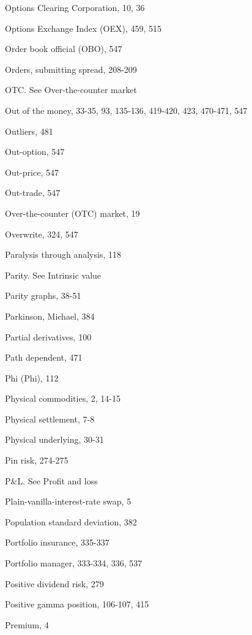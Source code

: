 \noindent Options Clearing Corporation, 10, 36\par
\noindent Options Exchange Index (OEX), 459, 515\par
\noindent Order book official (OBO), 547\par
\noindent Orders, submitting spread, 208-209\par
\noindent OTC. See Over-the-counter market\par
Out of the money, 33-35, 93, 135-136, 419-420, 423, 470-471, 547\par
\noindent Outliers, 481\par
\noindent Out-option, 547\par
\noindent Out-price, 547\par
\noindent Out-trade, 547\par
\noindent Over-the-counter (OTC) market, 19\par
\noindent Overwrite, 324, 547\par
\noindent Paralysis through analysis, 118\par
\noindent Parity. See Intrinsic value\par
\noindent Parity graphs, 38-51\par
\noindent Parkinson, Michael, 384\par
\noindent Partial derivatives, 100\par
\noindent Path dependent, 471\par
\noindent Phi (Phi), 112\par
\noindent Physical commodities, 2, 14-15\par
\noindent Physical settlement, 7-8\par
\noindent Physical underlying, 30-31\par
\noindent Pin risk, 274-275\par
\noindent P\&L. See Profit and loss\par
\noindent Plain-vanilla-interest-rate swap, 5\par
\noindent Population standard deviation, 382\par
\noindent Portfolio insurance, 335-337\par
\noindent Portfolio manager, 333-334, 336, 537\par
\noindent Positive dividend risk, 279\par
\noindent Positive gamma position, 106-107, 415\par
\noindent Premium, 4\par

